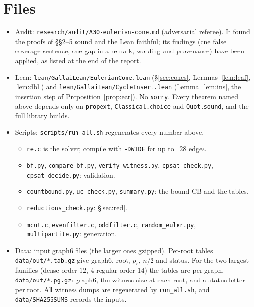 \documentclass[11pt]{amsart}
\theoremstyle{definition}
\newcommand{\pr}{p_r}
\newcommand{\CB}{\mathrm{CB}}
\begin{document}
\section*{Files}
\begin{itemize}[leftmargin=*]
\item Audit: \texttt{research/audit/A30-eulerian-cone.md} (adversarial referee). It found the proofs of
\S\S2--5 sound and the Lean faithful; its findings (one false coverage sentence, one gap in a remark,
wording and provenance) have been applied, as listed at the end of the report.
\item Lean: \texttt{lean/GallaiLean/EulerianCone.lean} (\S\ref{sec:cones}, Lemmas~\ref{lem:leaf}, \ref{lem:dbl}) and
\texttt{lean/GallaiLean/CycleInsert.lean} (Lemma~\ref{lem:ins}, the insertion step of Proposition~\ref{prop:ear}). No \texttt{sorry}. Every theorem named above
depends only on \texttt{propext}, \texttt{Classical.choice} and \texttt{Quot.sound}, and the full
library builds.
\item Scripts: \texttt{scripts/run\_all.sh} regenerates every number above.
\begin{itemize}
\item \texttt{re.c} is the solver; compile with \texttt{-DWIDE} for up to $128$ edges.
\item \texttt{bf.py}, \texttt{compare\_bf.py}, \texttt{verify\_witness.py}, \texttt{cpsat\_check.py},
\texttt{cpsat\_decide.py}: validation.
\item \texttt{countbound.py}, \texttt{uc\_check.py}, \texttt{summary.py}: the bound $\CB$ and the
tables.
\item \texttt{reductions\_check.py}: \S\ref{sec:red}.
\item \texttt{mcut.c}, \texttt{evenfilter.c}, \texttt{oddfilter.c}, \texttt{random\_euler.py},
\texttt{multipartite.py}: generation.
\end{itemize}
\item Data: input graph6 files (the larger ones gzipped). Per-root tables \texttt{data/out/*.tab.gz} give
graph6, root, $\pr$, $n/2$ and status. For the two largest families (dense order $12$, $4$-regular
order $14$) the tables are per graph, \texttt{data/out/*.pg.gz}: graph6, the witness size at each root,
and a status letter per root. All witness dumps are regenerated by \texttt{run\_all.sh}, and
\texttt{data/SHA256SUMS} records the inputs.
\end{itemize}
\end{document}
